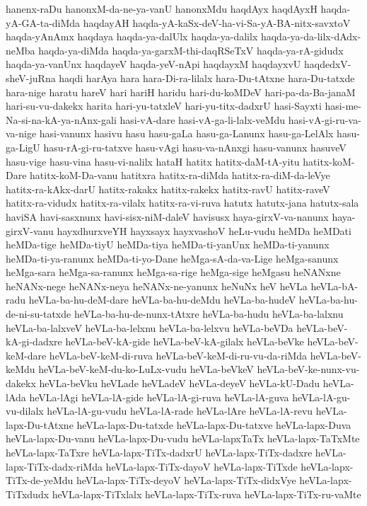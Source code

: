{hanenx-raDu
hanonxM-da-ne-ya-vanU
hanonxMdu
haqdAyx
haqdAyxH
haqda-yA-GA-ta-diMda
haqdayAH
haqda-yA-kaSx-deV-ha-vi-Sa-yA-BA-nitx-savxtoV
haqda-yAnAmx
haqdaya
haqda-ya-dalUlx
haqda-ya-dalilx
haqda-ya-da-lilx-dAdx-neMba
haqda-ya-diMda
haqda-ya-garxM-thi-daqRSeTxV
haqda-ya-rA-gidudx
haqda-ya-vanUnx
haqdayeV
haqda-yeV-nApi
haqdayxM
haqdayxvU
haqdedxV-sheV-juRna
haqdi
harAya
hara
hara-Di-ra-lilalx
hara-Du-tAtxne
hara-Du-tatxde
hara-nige
haratu
hareV
hari
hariH
haridu
hari-du-koMDeV
hari-pa-da-Ba-janaM
hari-su-vu-dakekx
harita
hari-yu-tatxleV
hari-yu-titx-dadxrU
hasi-Sayxti
hasi-me-Na-si-na-kA-ya-nAnx-gali
hasi-vA-dare
hasi-vA-ga-li-lalx-veMdu
hasi-vA-gi-ru-va-va-nige
hasi-vanunx
hasivu
hasu
hasu-gaLa
hasu-ga-Lanunx
hasu-ga-LelAlx
hasu-ga-LigU
hasu-rA-gi-ru-tatxve
hasu-vAgi
hasu-va-nAnxgi
hasu-vanunx
hasuveV
hasu-vige
hasu-vina
hasu-vi-nalilx
hataH
hatitx
hatitx-daM-tA-yitu
hatitx-koM-Dare
hatitx-koM-Da-vanu
hatitxra
hatitx-ra-diMda
hatitx-ra-diM-da-leVye
hatitx-ra-kAkx-darU
hatitx-rakakx
hatitx-rakekx
hatitx-ravU
hatitx-raveV
hatitx-ra-vidudx
hatitx-ra-vilalx
hatitx-ra-vi-ruva
hatutx
hatutx-jana
hatutx-sala
haviSA
havi-sasxnunx
havi-sisx-niM-daleV
havisusx
haya-girxV-va-nanunx
haya-girxV-vanu
hayxdhurxveYH
hayxsayx
hayxvashoV
heLu-vudu
heMDa
heMDati
heMDa-tige
heMDa-tiyU
heMDa-tiya
heMDa-ti-yanUnx
heMDa-ti-yanunx
heMDa-ti-ya-ranunx
heMDa-ti-yo-Dane
heMga-sA-da-va-Lige
heMga-sanunx
heMga-sara
heMga-sa-ranunx
heMga-sa-rige
heMga-sige
heMgasu
heNANxne
heNANx-nege
heNANx-neya
heNANx-ne-yanunx
heNuNx
heV
heVLa
heVLa-bA-radu
heVLa-ba-hu-deM-dare
heVLa-ba-hu-deMdu
heVLa-ba-hudeV
heVLa-ba-hu-de-ni-su-tatxde
heVLa-ba-hu-de-nunx-tAtxre
heVLa-ba-hudu
heVLa-ba-lalxnu
heVLa-ba-lalxveV
heVLa-ba-lelxnu
heVLa-ba-lelxvu
heVLa-beVDa
heVLa-beV-kA-gi-dadxre
heVLa-beV-kA-gide
heVLa-beV-kA-gilalx
heVLa-beVke
heVLa-beV-keM-dare
heVLa-beV-keM-di-ruva
heVLa-beV-keM-di-ru-vu-da-riMda
heVLa-beV-keMdu
heVLa-beV-keM-du-ko-LuLx-vudu
heVLa-beVkeV
heVLa-beV-ke-nunx-vu-dakekx
heVLa-beVku
heVLade
heVLadeV
heVLa-deyeV
heVLa-kU-Dadu
heVLa-lAda
heVLa-lAgi
heVLa-lA-gide
heVLa-lA-gi-ruva
heVLa-lA-guva
heVLa-lA-gu-vu-dilalx
heVLa-lA-gu-vudu
heVLa-lA-rade
heVLa-lAre
heVLa-lA-revu
heVLa-lapx-Du-tAtxne
heVLa-lapx-Du-tatxde
heVLa-lapx-Du-tatxve
heVLa-lapx-Duva
heVLa-lapx-Du-vanu
heVLa-lapx-Du-vudu
heVLa-lapxTaTx
heVLa-lapx-TaTxMte
heVLa-lapx-TaTxre
heVLa-lapx-TiTx-dadxrU
heVLa-lapx-TiTx-dadxre
heVLa-lapx-TiTx-dadx-riMda
heVLa-lapx-TiTx-dayoV
heVLa-lapx-TiTxde
heVLa-lapx-TiTx-de-yeMdu
heVLa-lapx-TiTx-deyoV
heVLa-lapx-TiTx-didxVye
heVLa-lapx-TiTxdudx
heVLa-lapx-TiTxlalx
heVLa-lapx-TiTx-ruva
heVLa-lapx-TiTx-ru-vaMte
}
